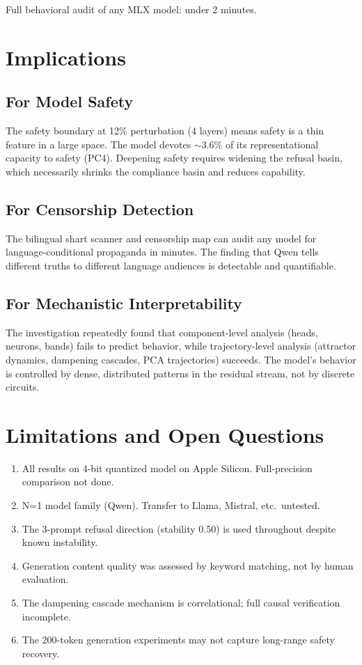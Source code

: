 \documentclass[11pt,a4paper]{article}
\begin{document}
Full behavioral audit of any MLX model: under 2 minutes.

\section{Implications}

\subsection{For Model Safety}
The safety boundary at 12\% perturbation (4 layers) means safety is a thin feature in a large space. The model devotes $\sim$3.6\% of its representational capacity to safety (PC4). Deepening safety requires widening the refusal basin, which necessarily shrinks the compliance basin and reduces capability.

\subsection{For Censorship Detection}
The bilingual shart scanner and censorship map can audit any model for language-conditional propaganda in minutes. The finding that Qwen tells different truths to different language audiences is detectable and quantifiable.

\subsection{For Mechanistic Interpretability}
The investigation repeatedly found that component-level analysis (heads, neurons, bands) fails to predict behavior, while trajectory-level analysis (attractor dynamics, dampening cascades, PCA trajectories) succeeds. The model's behavior is controlled by dense, distributed patterns in the residual stream, not by discrete circuits.

\section{Limitations and Open Questions}

\begin{enumerate}[nosep]
\item All results on 4-bit quantized model on Apple Silicon. Full-precision comparison not done.
\item N=1 model family (Qwen). Transfer to Llama, Mistral, etc.\ untested.
\item The 3-prompt refusal direction (stability 0.50) is used throughout despite known instability.
\item Generation content quality was assessed by keyword matching, not by human evaluation.
\item The dampening cascade mechanism is correlational; full causal verification incomplete.
\item The 200-token generation experiments may not capture long-range safety recovery.
\end{enumerate}
\end{document}
